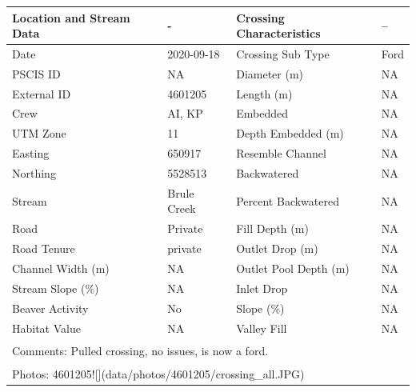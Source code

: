 \documentclass[
]{book}
\begin{document}
\begin{tabular}{l|l|l|l}
\hline
Location and Stream Data & - & Crossing Characteristics & --\\
\hline
Date & 2020-09-18 & Crossing Sub Type & Ford\\
\hline
PSCIS ID & NA & Diameter (m) & NA\\
\hline
External ID & 4601205 & Length (m) & NA\\
\hline
Crew & AI, KP & Embedded & NA\\
\hline
UTM Zone & 11 & Depth Embedded (m) & NA\\
\hline
Easting & 650917 & Resemble Channel & NA\\
\hline
Northing & 5528513 & Backwatered & NA\\
\hline
Stream & Brule Creek & Percent Backwatered & NA\\
\hline
Road & Private & Fill Depth (m) & NA\\
\hline
Road Tenure & private & Outlet Drop (m) & NA\\
\hline
Channel Width (m) & NA & Outlet Pool Depth (m) & NA\\
\hline
Stream Slope (\%) & NA & Inlet Drop & NA\\
\hline
Beaver Activity & No & Slope (\%) & NA\\
\hline
Habitat Value & NA & Valley Fill & NA\\
\hline
\multicolumn{4}{l}{\textsuperscript{} Comments: Pulled crossing, no issues, is now a ford.}\\
\multicolumn{4}{l}{\textsuperscript{} Photos: 4601205![](data/photos/4601205/crossing\_all.JPG)}\\
\end{tabular}
\end{document}
